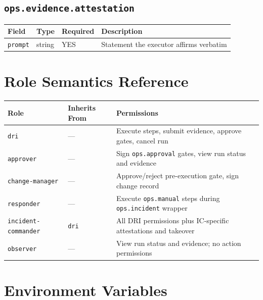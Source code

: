 \subsection{\texttt{ops.evidence.attestation}}

\begin{center}
\small
\begin{tabular}{lllp{5cm}}
\textbf{Field} & \textbf{Type} & \textbf{Required} & \textbf{Description} \\
\hline
\texttt{prompt} & string & YES & Statement the executor affirms verbatim \\
\end{tabular}
\end{center}

\section{Role Semantics Reference}
\label{sec:ref-roles}

\begin{center}
\small
\begin{tabular}{lp{3.5cm}p{5cm}}
\textbf{Role} & \textbf{Inherits From} & \textbf{Permissions} \\
\hline
\texttt{dri} & — & Execute steps, submit evidence, approve gates, cancel run \\
\texttt{approver} & — & Sign \texttt{ops.approval} gates, view run status and evidence \\
\texttt{change-manager} & — & Approve/reject pre-execution gate, sign change record \\
\texttt{responder} & — & Execute \texttt{ops.manual} steps during \texttt{ops.incident} wrapper \\
\texttt{incident-commander} & \texttt{dri} & All DRI permissions plus IC-specific attestations and takeover \\
\texttt{observer} & — & View run status and evidence; no action permissions \\
\end{tabular}
\end{center}

\section{Environment Variables}
\label{sec:ref-env-vars}

